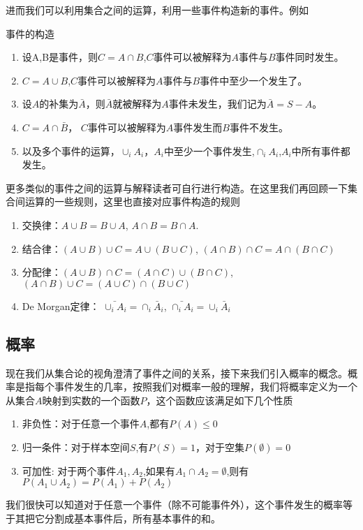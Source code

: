 进而我们可以利用集合之间的运算，利用一些事件构造新的事件。例如
\begin{corollary}{事件的构造}
\begin{enumerate}
\item 设A,B是事件，则$C = A \cap B$,$C$事件可以被解释为$A$事件与$B$事件同时发生。
\item $C = A \cup B$,$C$事件可以被解释为$A$事件与$B$事件中至少一个发生了。
\item 设$A$的补集为$\bar{A}$，则$\bar{A}$就被解释为$A$事件未发生，我们记为$\bar{A}=S-A$。
\item $C = A \cap \bar{B}$， $C$事件可以被解释为$A$事件发生而$B$事件不发生。
\item 以及多个事件的运算，$\cup_i A_i$，$A_i$中至少一个事件发生,$\cap_i A_i$,$A_i$中所有事件都发生。
\end{enumerate}
\end{corollary}
更多类似的事件之间的运算与解释读者可自行进行构造。在这里我们再回顾一下集合间运算的一些规则，这里也直接对应事件构造的规则
\begin{enumerate}
\item 交换律：$A \cup B = B \cup A$, $A \cap B = B \cap A$.
\item 结合律：$(A \cup B)\cup C = A \cup (B \cup C)$, $(A \cap B)\cap C = A \cap (B\cap C)$
\item 分配律：$(A\cup B)\cap C = (A \cap C) \cup (B \cap C)$, $(A\cap B) \cup C = (A \cup C)\cap (B \cup C)$
\item De Morgan定律： $\bar{\cup_i A_i} = \cap_i \bar{A}_i$, $\bar{\cap_i A_i} = \cup_i \bar{A}_i$
\end{enumerate}
\subsection{概率}
现在我们从集合论的视角澄清了事件之间的关系，接下来我们引入概率的概念。概率是指每个事件发生的几率，按照我们对概率一般的理解，我们将概率定义为一个从集合$A$映射到实数的一个函数$P$，这个函数应该满足如下几个性质
\begin{enumerate}
\item 非负性：对于任意一个事件$A$,都有$P(A)\leq 0$
\item 归一条件：对于样本空间$S$,有$P(S) = 1$，对于空集$P(\emptyset) = 0$
\item 可加性: 对于两个事件$A_1,A_2$,如果有$A_1 \cap A_2 = \emptyset$,则有 $P(A_1 \cup A_2) = P(A_1)+P(A_2)$
\end{enumerate}
我们很快可以知道对于任意一个事件（除不可能事件外），这个事件发生的概率等于其把它分割成基本事件后，所有基本事件的和。
